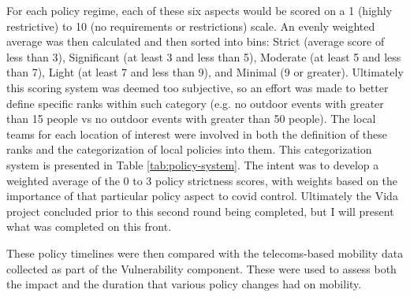For each policy regime, each of these six aspects would be scored on a 1 (highly restrictive) to 10 (no requirements or restrictions) scale. An evenly weighted average was then calculated and then sorted into bins: Strict (average score of less than 3), Significant (at least 3 and less than 5), Moderate (at least 5 and less than 7), Light (at least 7 and less than 9), and Minimal (9 or greater). Ultimately this scoring system was deemed too subjective, so an effort was made to better define specific ranks within such category (e.g. no outdoor events with greater than 15 people vs no outdoor events with greater than 50 people). The local teams for each location of interest were involved in both the definition of these ranks and the categorization of local policies into them. This categorization system is presented in Table \ref{tab:policy-system}. The intent was to develop a weighted average of the 0 to 3 policy strictness scores, with weights based on the importance of that particular policy aspect to \ac{covid} control. Ultimately the Vida project concluded prior to this second round being completed, but I will present what was completed on this front.

These policy timelines were then compared with the telecoms-based mobility data collected as part of the Vulnerability component. These were used to assess both the impact and the duration that various policy changes had on mobility.

